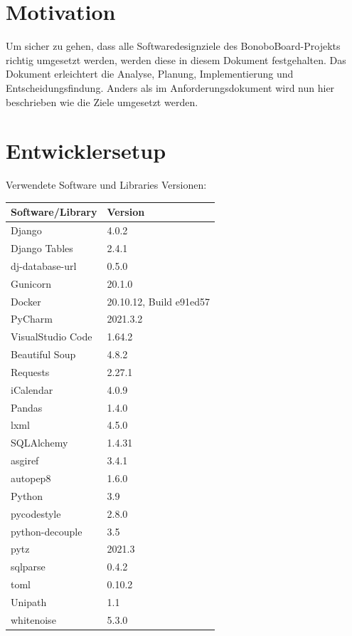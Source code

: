 \documentclass[a4paper,11pt]{scrartcl}
\begin{document}



\section{Motivation}
Um sicher zu gehen, dass alle Softwaredesignziele des BonoboBoard-Projekts richtig umgesetzt werden, werden diese in diesem Dokument festgehalten. Das Dokument erleichtert die Analyse, Planung, Implementierung und Entscheidungsfindung. Anders als im Anforderungsdokument wird nun hier beschrieben wie die Ziele umgesetzt werden. 

\section{Entwicklersetup}
Verwendete Software und Libraries Versionen:
\begin{table}[H]
\begin{tabular}{|p{5cm}|p{5cm}|}
\hline
\textbf{Software/Library} & \textbf{Version} \\ \hline
	Django &  4.0.2\\ \hline
	Django Tables & 2.4.1 \\ \hline
	dj-database-url & 0.5.0 \\ \hline
	Gunicorn & 20.1.0 \\ \hline
	Docker & 20.10.12, Build e91ed57 \\ \hline
	PyCharm & 2021.3.2 \\ \hline
	VisualStudio Code & 1.64.2 \\ \hline
	Beautiful Soup & 4.8.2 \\ \hline
	Requests & 2.27.1 \\ \hline
	iCalendar & 4.0.9 \\ \hline
	Pandas & 1.4.0 \\ \hline
	lxml & 4.5.0 \\ \hline
	SQLAlchemy & 1.4.31 \\ \hline
	asgiref & 3.4.1 \\ \hline
	autopep8 & 1.6.0 \\ \hline
	Python & 3.9 \\ \hline
	pycodestyle & 2.8.0 \\ \hline
	python-decouple & 3.5 \\ \hline
	pytz & 2021.3 \\ \hline
	sqlparse & 0.4.2 \\ \hline
	toml & 0.10.2 \\ \hline
	Unipath & 1.1 \\ \hline
	whitenoise & 5.3.0 \\ \hline
\end{tabular}
\end{table}
\end{document}
